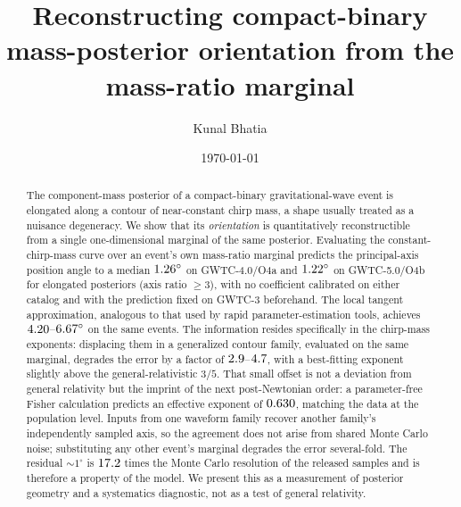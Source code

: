 \documentclass[aps,prd,twocolumn,amsmath,amssymb,nofootinbib,superscriptaddress]{revtex4-2}
\begin{document}
\title{Reconstructing compact-binary mass-posterior orientation from the mass-ratio marginal}
\author{Kunal Bhatia}
\date{\today}

\begin{abstract}
The component-mass posterior of a compact-binary gravitational-wave event is elongated along a contour of
near-constant chirp mass, a shape usually treated as a nuisance degeneracy. We show that its
\emph{orientation} is quantitatively reconstructible from a single one-dimensional marginal of the same
posterior. Evaluating the constant-chirp-mass curve over an event's own mass-ratio marginal predicts the
principal-axis position angle to a median $1.26^\circ$ on GWTC-4.0/O4a and
$1.22^\circ$ on GWTC-5.0/O4b for elongated posteriors (axis ratio $\ge 3$), with no
coefficient calibrated on either catalog and with the prediction fixed on GWTC-3 beforehand. The local
tangent approximation, analogous to that used by rapid parameter-estimation tools, achieves
$4.20$--$6.67^\circ$ on the same events. The information resides specifically in
the chirp-mass exponents: displacing them in a generalized contour family, evaluated on the same
marginal, degrades the error by a factor of $2.9$--$4.7$, with a best-fitting exponent
slightly above the general-relativistic $3/5$. That small offset is not a deviation from general
relativity but the imprint of the next post-Newtonian order: a parameter-free Fisher calculation predicts
an effective exponent of $0.630$, matching the data at the population level. Inputs from one
waveform family recover another family's independently sampled axis, so the agreement does not arise from
shared Monte Carlo noise; substituting any other event's marginal degrades the error several-fold. The residual
$\sim\!1^\circ$ is $17.2$ times the Monte Carlo resolution of the released samples and is therefore
a property of the model. We present this as a measurement of posterior geometry and a systematics
diagnostic, not as a test of general relativity.
\end{abstract}
\maketitle
\end{document}
